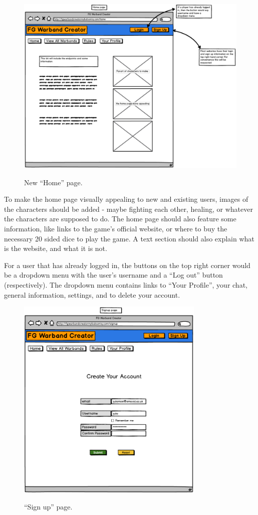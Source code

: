 \documentclass[12pt,a4paper]{article}
\begin{document}
\begin{figure}[h!]
 \centering
 \includegraphics[width=1\textwidth]{img/home}
 \label{fig:3}
 \caption{New ``Home'' page.}
\end{figure}

To make the home page visually appealing to new and existing users, images of the characters should be added - maybe fighting each other, healing, or whatever the characters are supposed to do. The home page should also feature some information, like links to the game's official website, or where to buy the necessary 20 sided dice to play the game. A text section should also explain what is the website, and what it is not. 

For a user that has already logged in, the buttons on the top right corner would be a dropdown menu with the user's username and a ``Log out'' button (respectively). The dropdown menu contains links to ``Your Profile'', your chat, general information, settings, and to delete your account.

\begin{figure}[h!]
 \centering
 \includegraphics[width=0.8\textwidth]{img/signup}
 \label{fig:4}
 \caption{``Sign up'' page.}
\end{figure}
\end{document}
